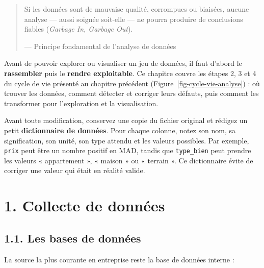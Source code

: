 \documentclass[
  french,
  letterpaper,
  open=any]{scrbook}
\theoremstyle{definition}
\theoremstyle{definition}
\theoremstyle{remark}
\begin{document}
\begin{quote}
Si les données sont de mauvaise qualité, corrompues ou biaisées, aucune
analyse --- aussi soignée soit-elle --- ne pourra produire de
conclusions fiables (\emph{Garbage In, Garbage Out}).

--- Principe fondamental de l'analyse de données
\end{quote}

Avant de pouvoir explorer ou visualiser un jeu de données, il faut
d'abord le \textbf{rassembler} puis le \textbf{rendre exploitable}. Ce
chapitre couvre les étapes 2, 3 et 4 du cycle de vie présenté au
chapitre précédent (Figure~\ref{fig-cycle-vie-analyse}) : où trouver les
données, comment détecter et corriger leurs défauts, puis comment les
transformer pour l'exploration et la visualisation.

\begin{tcolorbox}[enhanced jigsaw, arc=.35mm, bottomrule=.15mm, bottomtitle=1mm, breakable, colback=white, colbacktitle=quarto-callout-note-color!10!white, colframe=quarto-callout-note-color-frame, coltitle=black, left=2mm, leftrule=.75mm, opacityback=0, opacitybacktitle=0.6, rightrule=.15mm, title=\textcolor{quarto-callout-note-color}{\faInfo}\hspace{0.5em}{Réflexe de débutant : connaître son tableau}, titlerule=0mm, toprule=.15mm, toptitle=1mm]

Avant toute modification, conservez une copie du fichier original et
rédigez un petit \textbf{dictionnaire de données}. Pour chaque colonne,
notez son nom, sa signification, son unité, son type attendu et les
valeurs possibles. Par exemple, \texttt{prix} peut être un nombre
positif en MAD, tandis que \texttt{type\_bien} peut prendre les valeurs
« appartement », « maison » ou « terrain ». Ce dictionnaire évite de
corriger une valeur qui était en réalité valide.

\end{tcolorbox}

\section{1. Collecte de données}\label{collecte-de-donnuxe9es}

\subsection{1.1. Les bases de données}\label{les-bases-de-donnuxe9es}

La source la plus courante en entreprise reste la base de données
interne :
\end{document}
